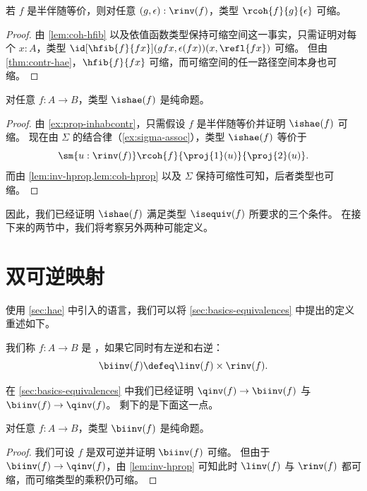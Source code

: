 \begin{lem}\label{lem:coh-hprop}
  若 $f$ 是半伴随等价，则对任意 $(g,\epsilon) : \rinv(f)$，类型 $\rcoh{f}{g}{\epsilon}$ 可缩。
\end{lem}
\begin{proof}
  由 \cref{lem:coh-hfib} 以及依值函数类型保持可缩空间这一事实，只需证明对每个 $x:A$，类型 $\id[\hfib{f}{fx}]{(gfx,\epsilon(fx))}{(x,\refl{fx})}$ 可缩。
  但由 \cref{thm:contr-hae}，$\hfib{f}{fx}$ 可缩，而可缩空间的任一路径空间本身也可缩。
\end{proof}

\begin{thm}\label{thm:hae-hprop}
  对任意 $f : A \to B$，类型 $\ishae(f)$ 是纯命题。
\end{thm}
\begin{proof}
  由 \cref{ex:prop-inhabcontr}，只需假设 $f$ 是半伴随等价并证明 $\ishae(f)$ 可缩。
  现在由 $\Sigma$ 的结合律（\cref{ex:sigma-assoc}），类型 $\ishae(f)$ 等价于
  \[\sm{u : \rinv(f)} \rcoh{f}{\proj{1}(u)}{\proj{2}(u)}.\]
  而由 \cref{lem:inv-hprop,lem:coh-hprop} 以及 $\Sigma$ 保持可缩性可知，后者类型也可缩。
\end{proof}

因此，我们已经证明 $\ishae(f)$ 满足类型 $\isequiv(f)$ 所要求的三个条件。
在接下来的两节中，我们将考察另外两种可能定义。

%
%
%

\section{双可逆映射}
\label{sec:biinv}

%
%
%

使用 \cref{sec:hae} 中引入的语言，我们可以将 \cref{sec:basics-equivalences} 中提出的定义重述如下。

\begin{defn}\label{defn:biinv}
  我们称 $f:A\to B$ 是
  ，如果它同时有左逆和右逆：
  \[ \biinv (f) \defeq \linv(f) \times \rinv(f). \]
\end{defn}

在 \cref{sec:basics-equivalences} 中我们已经证明 $\qinv(f)\to\biinv(f)$ 与 $\biinv(f)\to\qinv(f)$。
剩下的是下面这一点。

\begin{thm}\label{thm:isprop-biinv}
  对任意 $f:A\to B$，类型 $\biinv(f)$ 是纯命题。
\end{thm}
\begin{proof}
  我们可设 $f$ 是双可逆并证明 $\biinv(f)$ 可缩。
  但由于 $\biinv(f)\to\qinv(f)$，由 \cref{lem:inv-hprop} 可知此时 $\linv(f)$ 与 $\rinv(f)$ 都可缩，而可缩类型的乘积仍可缩。
\end{proof}

